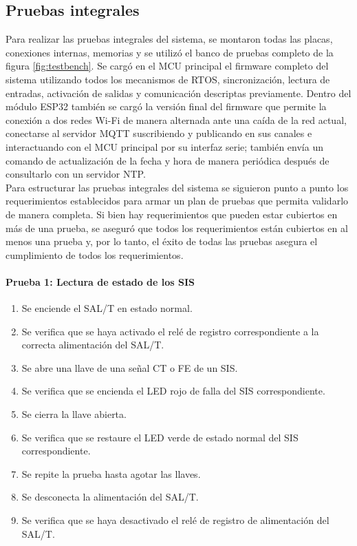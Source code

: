 \subsection{Pruebas integrales}

Para realizar las pruebas integrales del sistema, se montaron todas las placas, conexiones internas, memorias y se utilizó el banco de pruebas completo de la figura \ref{fig:testbench}. Se cargó en el MCU principal el firmware completo del sistema utilizando todos los mecanismos de RTOS, sincronización, lectura de entradas, activación de salidas y comunicación descriptas previamente. Dentro del módulo ESP32 también se cargó la versión final del firmware que permite la conexión a dos redes Wi-Fi de manera alternada ante una caída de la red actual, conectarse al servidor MQTT suscribiendo y publicando en sus canales e interactuando con el MCU principal por su interfaz serie; también envía un comando de actualización de la fecha y hora de manera periódica después de consultarlo con un servidor NTP. \\

Para estructurar las pruebas integrales del sistema se siguieron punto a punto los requerimientos establecidos para armar un plan de pruebas que permita validarlo de manera completa. Si bien hay requerimientos que pueden estar cubiertos en más de una prueba, se aseguró que todos los requerimientos están cubiertos en al menos una prueba y, por lo tanto, el éxito de todas las pruebas asegura el cumplimiento de todos los requerimientos. \\ 

\paragraph{Prueba 1: Lectura de estado de los SIS}
\begin{enumerate}
\item	Se enciende el SAL/T en estado normal.
\item	Se verifica que se haya activado el relé de registro correspondiente a la correcta alimentación del SAL/T.
\item	Se abre una llave de una señal CT o FE de un SIS.
\item	Se verifica que se encienda el LED rojo de falla del SIS correspondiente.
\item	Se cierra la llave abierta.
\item	Se verifica que se restaure el LED verde de estado normal del SIS correspondiente.
\item	Se repite la prueba hasta agotar las llaves.
\item	Se desconecta la alimentación del SAL/T.
\item	Se verifica que se haya desactivado el relé de registro de alimentación del SAL/T.
\end{enumerate}

